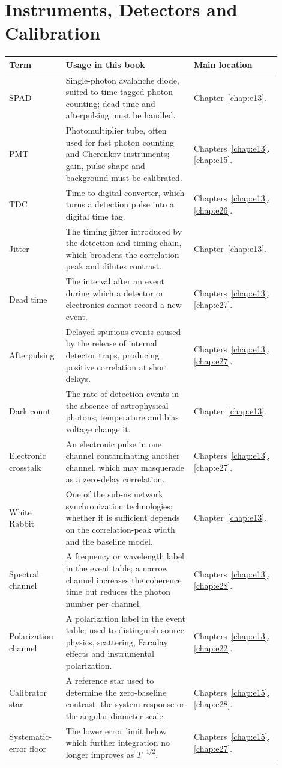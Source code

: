 \section{Instruments, Detectors and Calibration}
\label{appsec:c-instrument}

\begin{longtable}{p{0.20\linewidth}p{0.45\linewidth}p{0.25\linewidth}}
\toprule
Term & Usage in this book & Main location \\
\midrule
SPAD & Single-photon avalanche diode, suited to time-tagged photon counting; dead time and afterpulsing must be handled. & Chapter~\ref{chap:e13}. \\
PMT & Photomultiplier tube, often used for fast photon counting and Cherenkov instruments; gain, pulse shape and background must be calibrated. & Chapters~\ref{chap:e13}, \ref{chap:e15}. \\
TDC & Time-to-digital converter, which turns a detection pulse into a digital time tag. & Chapters~\ref{chap:e13}, \ref{chap:e26}. \\
Jitter & The timing jitter introduced by the detection and timing chain, which broadens the correlation peak and dilutes contrast. & Chapter~\ref{chap:e13}. \\
Dead time & The interval after an event during which a detector or electronics cannot record a new event. & Chapters~\ref{chap:e13}, \ref{chap:e27}. \\
Afterpulsing & Delayed spurious events caused by the release of internal detector traps, producing positive correlation at short delays. & Chapters~\ref{chap:e13}, \ref{chap:e27}. \\
Dark count & The rate of detection events in the absence of astrophysical photons; temperature and bias voltage change it. & Chapter~\ref{chap:e13}. \\
Electronic crosstalk & An electronic pulse in one channel contaminating another channel, which may masquerade as a zero-delay correlation. & Chapters~\ref{chap:e13}, \ref{chap:e27}. \\
White Rabbit & One of the sub-ns network synchronization technologies; whether it is sufficient depends on the correlation-peak width and the baseline model. & Chapter~\ref{chap:e13}. \\
Spectral channel & A frequency or wavelength label in the event table; a narrow channel increases the coherence time but reduces the photon number per channel. & Chapters~\ref{chap:e13}, \ref{chap:e28}. \\
Polarization channel & A polarization label in the event table; used to distinguish source physics, scattering, Faraday effects and instrumental polarization. & Chapters~\ref{chap:e13}, \ref{chap:e22}. \\
Calibrator star & A reference star used to determine the zero-baseline contrast, the system response or the angular-diameter scale. & Chapters~\ref{chap:e15}, \ref{chap:e28}. \\
Systematic-error floor & The lower error limit below which further integration no longer improves as \(T^{-1/2}\). & Chapters~\ref{chap:e15}, \ref{chap:e27}. \\
\bottomrule
\end{longtable}

